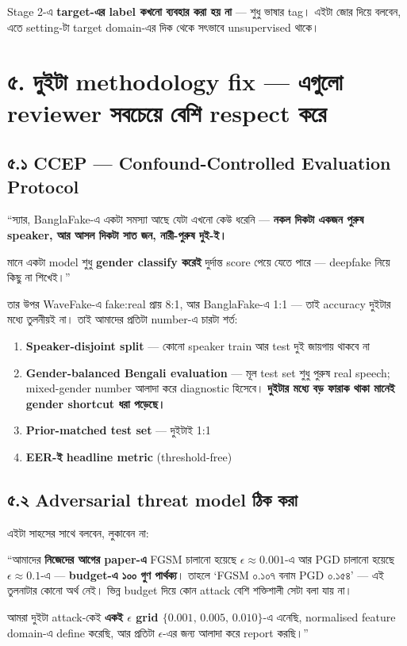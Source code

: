 \documentclass[11pt,a4paper]{article}
\newenvironment{say}{%
  \def\FrameCommand{\textcolor{barcol}{\vrule width 3pt}\hspace{8pt}}%
  \MakeFramed{\advance\hsize-\width \FrameRestore}%
}{\endMakeFramed}
\begin{document}
Stage 2-এ \textbf{target-এর label কখনো ব্যবহার করা হয় না} --- শুধু ভাষার tag।
এইটা জোর দিয়ে বলবেন, এতে setting-টা target domain-এর দিক থেকে সৎভাবে
unsupervised থাকে।

\section*{৫. দুইটা methodology fix --- এগুলো reviewer সবচেয়ে বেশি respect করে}

\subsection*{৫.১ CCEP --- Confound-Controlled Evaluation Protocol}

\begin{say}
``স্যার, BanglaFake-এ একটা সমস্যা আছে যেটা এখনো কেউ ধরেনি --- \textbf{নকল দিকটা
একজন পুরুষ speaker, আর আসল দিকটা সাত জন, নারী-পুরুষ দুই-ই।}

\vspace{4pt}
মানে একটা model শুধু \textbf{gender classify করেই} দুর্দান্ত score পেয়ে যেতে
পারে --- deepfake নিয়ে কিছু না শিখেই।''
\end{say}

তার উপর WaveFake-এ fake:real প্রায় 8:1, আর BanglaFake-এ 1:1 --- তাই accuracy
দুইটার মধ্যে তুলনীয়ই না। তাই আমাদের প্রতিটা number-এ চারটা শর্ত:

\begin{enumerate}
\item \textbf{Speaker-disjoint split} --- কোনো speaker train আর test দুই জায়গায় থাকবে না
\item \textbf{Gender-balanced Bengali evaluation} --- মূল test set শুধু পুরুষ real
      speech; mixed-gender number আলাদা করে diagnostic হিসেবে।
      \textbf{দুইটার মধ্যে বড় ফারাক থাকা মানেই gender shortcut ধরা পড়েছে।}
\item \textbf{Prior-matched test set} --- দুইটাই 1:1
\item \textbf{EER-ই headline metric} (threshold-free)
\end{enumerate}

\subsection*{৫.২ Adversarial threat model ঠিক করা}

এইটা সাহসের সাথে বলবেন, লুকাবেন না:

\begin{say}
``আমাদের \textbf{নিজেদের আগের paper-এ} FGSM চালানো হয়েছে $\epsilon \approx 0.001$-এ
আর PGD চালানো হয়েছে $\epsilon \approx 0.1$-এ --- \textbf{budget-এ ১০০ গুণ পার্থক্য}।
তাহলে `FGSM ০.১০৭ বনাম PGD ০.১৫৪' --- এই তুলনাটার কোনো অর্থ নেই। ভিন্ন budget
দিয়ে কোন attack বেশি শক্তিশালী সেটা বলা যায় না।

\vspace{4pt}
আমরা দুইটা attack-কেই \textbf{একই $\epsilon$ grid $\{0.001,\, 0.005,\, 0.010\}$}-এ
এনেছি, normalised feature domain-এ define করেছি, আর প্রতিটা $\epsilon$-এর জন্য
আলাদা করে report করছি।''
\end{say}
\end{document}

